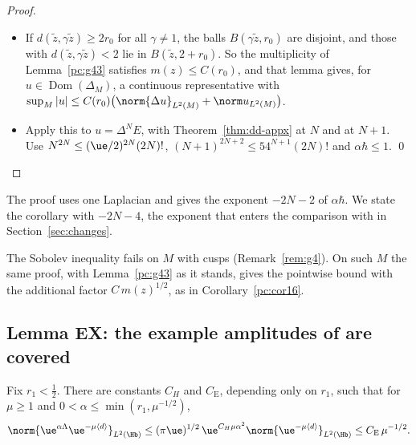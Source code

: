 \begin{proof}
\begin{itemize}
\item If $d(\tilde z,\gamma\tilde z)\ge2r_0$ for all $\gamma\ne1$, the balls $B(\gamma\tilde z,r_0)$ are disjoint, and those with
$d(\tilde z,\gamma\tilde z)<2$ lie in $B(\tilde z,2+r_0)$. So the multiplicity of Lemma~\ref{pc:g43} satisfies $m(z)\le C(r_0)$, and that lemma gives, for
$u\in\operatorname{Dom}(\Delta_M)$, a continuous representative with
$\sup_M|u|\le C(r_0)\bigl(\norm{\Delta u}_{L^2(M)}+\norm u_{L^2(M)}\bigr)$.
\item Apply this to $u=\Delta^NE$, with Theorem~\ref{thm:dd-appx} at $N$ and at $N+1$. Use $N^{2N}\le(\ue/2)^{2N}(2N)!$,
$(N+1)^{2N+2}\le54^{N+1}(2N)!$ and $\alpha\hbar\le1$. \qed
\end{itemize}
\end{proof}

\begin{remark}
The proof uses one Laplacian and gives the exponent $-2N-2$ of $\alpha\hbar$. We state the corollary with $-2N-4$, the exponent that
enters the comparison with \cite[(1.34)]{S} in Section~\ref{sec:changes}.
\end{remark}

\begin{remark}[Cusped $M$]
The Sobolev inequality \cite[(5.91)]{S} fails on $M$ with cusps (Remark~\ref{rem:g4}). On such $M$ the same proof, with Lemma~\ref{pc:g43} as it stands, gives the pointwise bound with the additional factor $C\,m(z)^{1/2}$, as in Corollary~\ref{pc:cor16}.
\end{remark}


\subsection{Lemma EX: the example amplitudes of \texorpdfstring{\cite{S}}{[S]} are covered}\label{subsec:dd-ex}

\begin{lemma}[EX]\label{lem:ex}
Fix $r_1<\tfrac12$. There are constants $C_H$ and $C_{\mathrm E}$, depending only on $r_1$, such that for $\mu\ge1$ and
$0<\alpha\le\min(r_1,\mu^{-1/2})$,
\[
\norm{\ue^{\alpha\Lambda}\ue^{-\mu\langle d\rangle}}_{L^2(\Hb)}\le(\pi\ue)^{1/2}\,\ue^{C_H\mu\alpha^2}\norm{\ue^{-\mu\langle d\rangle}}_{L^2(\Hb)}\le C_{\mathrm E}\,\mu^{-1/2}.
\]
\end{lemma}

